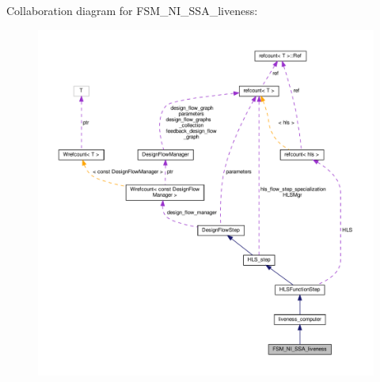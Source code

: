 Collaboration diagram for F\+S\+M\+\_\+\+N\+I\+\_\+\+S\+S\+A\+\_\+liveness\+:
\nopagebreak
\begin{figure}[H]
\begin{center}
\leavevmode
\includegraphics[width=350pt]{d2/d36/classFSM__NI__SSA__liveness__coll__graph}
\end{center}
\end{figure}
